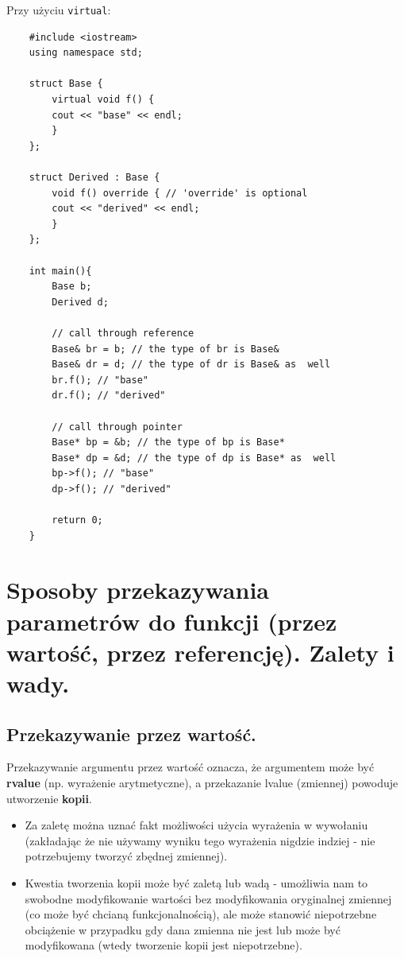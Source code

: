 \documentclass[12pt]{article}
\begin{document}
    Przy użyciu \texttt{virtual}:
    \begin{verbatim}
    #include <iostream>
    using namespace std;

    struct Base {
        virtual void f() {
        cout << "base" << endl;
        }
    };

    struct Derived : Base {
        void f() override { // 'override' is optional
        cout << "derived" << endl;
        }
    };

    int main(){
        Base b;
        Derived d;

        // call through reference
        Base& br = b; // the type of br is Base&
        Base& dr = d; // the type of dr is Base& as  well
        br.f(); // "base"
        dr.f(); // "derived"

        // call through pointer
        Base* bp = &b; // the type of bp is Base*
        Base* dp = &d; // the type of dp is Base* as  well
        bp->f(); // "base"
        dp->f(); // "derived"

        return 0;
    }
    \end{verbatim}

    \newpage

    \section{Sposoby przekazywania parametrów do funkcji (przez wartość, przez referencję). Zalety i wady.}

    \subsection{Przekazywanie przez wartość.}

    Przekazywanie argumentu przez wartość oznacza, że argumentem może być \textbf{rvalue} (np. wyrażenie arytmetyczne), a przekazanie
    lvalue (zmiennej) powoduje utworzenie \textbf{kopii}.
    \begin{itemize}
        \item Za zaletę można uznać fakt możliwości użycia wyrażenia w wywołaniu (zakładając że nie używamy wyniku tego
        wyrażenia nigdzie indziej - nie potrzebujemy tworzyć zbędnej zmiennej).
        \item Kwestia tworzenia kopii może być zaletą lub wadą - umożliwia nam to swobodne modyfikowanie wartości
        bez modyfikowania oryginalnej zmiennej (co może być chcianą funkcjonalnością), ale może stanowić niepotrzebne obciążenie
        w przypadku gdy dana zmienna nie jest lub może być modyfikowana (wtedy tworzenie kopii jest niepotrzebne).
    \end{itemize}
\end{document}
